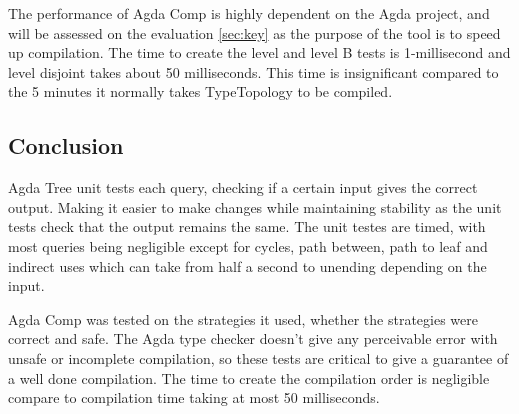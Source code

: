 The performance of Agda Comp is highly dependent on the Agda project, and will
be assessed on the evaluation \cref{sec:key} as the purpose of the tool
is to speed up compilation. The time to create the level and level B tests is
1-millisecond and level disjoint takes about 50 milliseconds. This time is
insignificant compared to the 5 minutes it normally takes TypeTopology to be
compiled.

\subsection{Conclusion}

Agda Tree unit tests each query, checking if a certain input gives the correct
output. Making it easier to make changes while maintaining stability as the
unit tests check that the output remains the same. The unit testes are timed,
with most queries being negligible except for cycles, path between, path to
leaf and indirect uses which can take from half a second to unending depending
on the input.  

Agda Comp was tested on the strategies it used, whether the strategies were
correct and safe. The Agda type checker doesn't give any perceivable error with
unsafe or incomplete compilation, so these tests are critical to give a
guarantee of a well done compilation. The time to create the compilation order
is negligible compare to compilation time taking at most 50 milliseconds.

%

